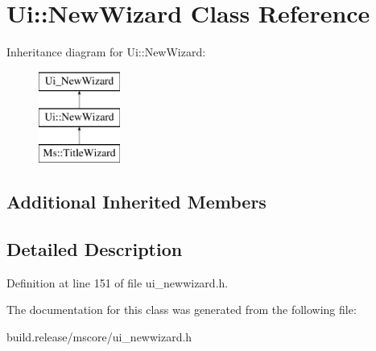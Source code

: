 \hypertarget{class_ui_1_1_new_wizard}{}\section{Ui\+:\+:New\+Wizard Class Reference}
\label{class_ui_1_1_new_wizard}
Inheritance diagram for Ui\+:\+:New\+Wizard\+:\begin{figure}[H]
\begin{center}
\leavevmode
\includegraphics[height=3.000000cm]{class_ui_1_1_new_wizard}
\end{center}
\end{figure}
\subsection*{Additional Inherited Members}


\subsection{Detailed Description}


Definition at line 151 of file ui\+\_\+newwizard.\+h.



The documentation for this class was generated from the following file\+:\begin{DoxyCompactItemize}
\item 
build.\+release/mscore/ui\+\_\+newwizard.\+h\end{DoxyCompactItemize}
